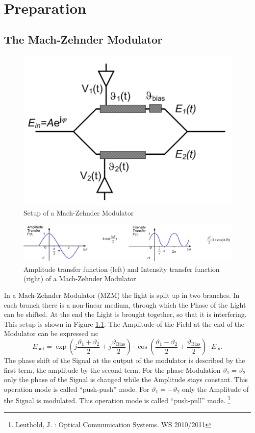 
\chapter{Preparation}
\section{The Mach-Zehnder Modulator}
\label{sec:MZM}
\begin{figure}[h]
  \centering
  \includegraphics[width=.5\columnwidth]{Grafiken/Mach-Zehnder.jpg}

\caption{Setup of a Mach-Zehnder Modulator}
\label{fig:MZI}
\end{figure}
\begin{figure}[ht]
  \centering
  \includegraphics[width=\columnwidth]{Grafiken/Mach-Zender-Transfer1.jpg}

\caption{Amplitude transfer function (left) and Intensity transfer function (right) of a Mach-Zehnder Modulator }
\label{fig:MZI_plot}
\end{figure}


In a Mach-Zehnder Modulator (MZM) the light is split up in two branches. In each branch there is a non-linear medium, through which the Phase of the Light can be shifted. At the end the Light is brought together, so that it is interfering. This setup is shown in Figure \ref{fig:MZI}. The Amplitude of the Field at the end of the Modulator can be expressed as:
\begin{equation}
 E_{\mathrm{out}}=\exp\left(j\frac{\vartheta_1+\vartheta_2}{2}+j\frac{\vartheta_{\mathrm{Bias}}}{2} \right)\cdot\cos\left(\frac{\vartheta_1-\vartheta_2}{2}+\frac{\vartheta_{\mathrm{Bias}}}{2}\right)\cdot E_{\mathrm{in}} .
\end{equation}
The phase shift of the Signal at the output of the modulator is described by the first term, the amplitude by the second term. For the phase Modulation $\vartheta_1 = \vartheta_2$ only the phase of the Signal is changed while the Amplitude stays constant. This operation mode is called "`push-push"' mode. For $\vartheta_1 = -\vartheta_2$ only the Amplitude of the Signal is modulated. This operation mode is called "`push-pull"' mode. \footnote[1]{Leuthold, J. : Optical Communication Systems. WS 2010/2011}



